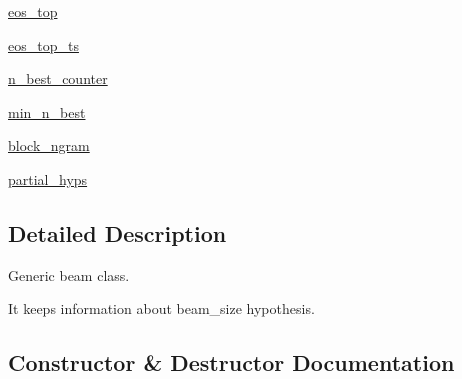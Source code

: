 \begin{DoxyCompactItemize}
\item 
\hyperlink{classprojects_1_1controllable__dialogue_1_1controllable__seq2seq_1_1controllable__seq2seq_1_1Beam_a573e769dffdbb74a1861abccd82acc34}{eos\+\_\+top}
\item 
\hyperlink{classprojects_1_1controllable__dialogue_1_1controllable__seq2seq_1_1controllable__seq2seq_1_1Beam_a68801372f27ac9fe8663322114a5f016}{eos\+\_\+top\+\_\+ts}
\item 
\hyperlink{classprojects_1_1controllable__dialogue_1_1controllable__seq2seq_1_1controllable__seq2seq_1_1Beam_af76a4cb47c1e4b9dc267f34821ab81d9}{n\+\_\+best\+\_\+counter}
\item 
\hyperlink{classprojects_1_1controllable__dialogue_1_1controllable__seq2seq_1_1controllable__seq2seq_1_1Beam_ad715f2d5f641843da30a95933c522384}{min\+\_\+n\+\_\+best}
\item 
\hyperlink{classprojects_1_1controllable__dialogue_1_1controllable__seq2seq_1_1controllable__seq2seq_1_1Beam_a6f281e607c65ed2d1ba434f64d6577d9}{block\+\_\+ngram}
\item 
\hyperlink{classprojects_1_1controllable__dialogue_1_1controllable__seq2seq_1_1controllable__seq2seq_1_1Beam_a58867f3a37a03b4d8904b09035352534}{partial\+\_\+hyps}
\end{DoxyCompactItemize}


\subsection{Detailed Description}
\begin{DoxyVerb}Generic beam class.

It keeps information about beam_size hypothesis.
\end{DoxyVerb}
 

\subsection{Constructor \& Destructor Documentation}
\mbox{\label{classprojects_1_1controllable__dialogue_1_1controllable__seq2seq_1_1controllable__seq2seq_1_1Beam_ad750b2491841b08785706eb6e8fff097}} 
